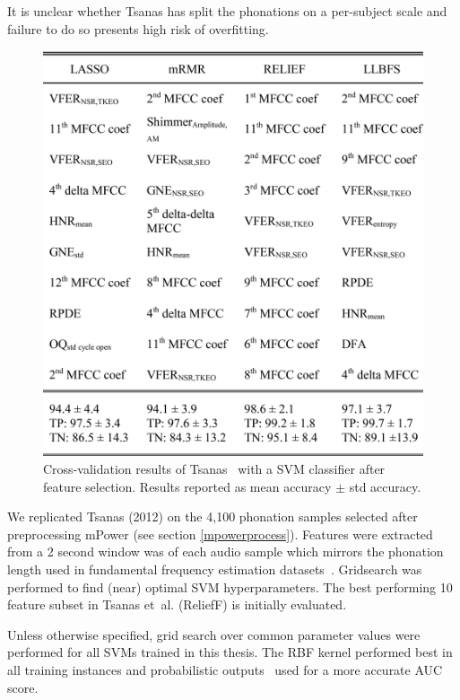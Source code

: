 \documentclass[12pt, twoside]{book}
\begin{document}
\begin{highlight}
It is unclear whether Tsanas has split the phonations on a per-subject scale and failure to do so presents high risk of overfitting.
\end{highlight}

\begin{figure}[h]
\caption{Cross-validation results of Tsanas~\cite{tsanas2012novel} with a SVM classifier after feature selection. Results reported as mean accuracy $\pm$ std accuracy.}
\label{tsanasresults}
\centering\includegraphics[width=0.75\linewidth]{tsanas.png}
\end{figure}
 
We replicated Tsanas (2012) on the 4,100 phonation samples selected after preprocessing mPower (see section \ref{mpowerprocess}). Features were extracted from a 2 second window was of each audio sample which mirrors the phonation length used in fundamental frequency estimation datasets~\cite{tsanas2014robust}. Gridsearch was performed to find (near) optimal SVM hyperparameters. The best performing 10 feature subset in Tsanas et~al. (ReliefF) is initially evaluated.

\begin{highlight}
	Unless otherwise specified, grid search over common parameter values were performed for all SVMs trained in this thesis. The RBF kernel performed best in all training instances and probabilistic outputs~\cite{svmprobabilistic} used for a more accurate AUC score.
\end{highlight}
\end{document}
